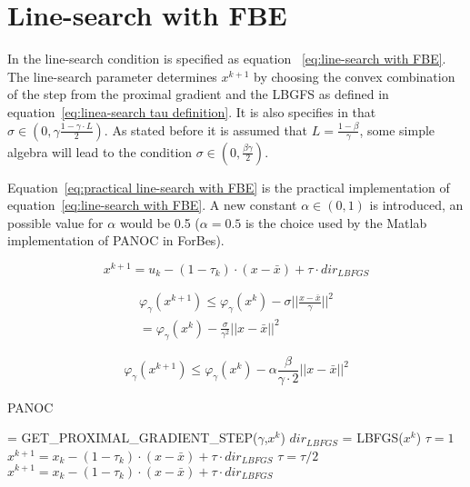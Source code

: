 	
	\section{Line-search with FBE}
	In \cite{LorenzoStella2017} the line-search condition is specified as equation ~\ref{eq:line-search with FBE}. The line-search parameter determines $x^{k+1}$ by choosing the convex combination of the step from the proximal gradient and the LBGFS as defined in equation~\ref{eq:linea-search tau definition}. It is also specifies in \cite{LorenzoStella2017} that $\sigma \in (0, \gamma \frac{1-\gamma\cdot L}{2})$. As stated before it is assumed that $L=\frac{1-\beta}{\gamma}$, some simple algebra will lead to the condition $\sigma \in (0,\frac{\beta \gamma}{2})$.
	
	 Equation~\ref{eq:practical line-search with FBE} is the practical implementation of equation~\ref{eq:line-search with FBE}. A new constant $\alpha \in (0,1)$ is introduced, an possible value for $\alpha$ would be 0.5 ($\alpha=0.5$ is the choice used by the Matlab implementation of PANOC in ForBes).
	
	\begin{equation}
		x^{k+1} = u_k - (1-\tau_k)\cdot (x-\bar{x}) + \tau \cdot dir_{LBFGS}
		\label{eq:linea-search tau definition}
	\end{equation}
	
	\begin{eqnarray}
		\label{eq:line-search with FBE}
		\varphi_{\gamma}(x^{k+1})\leq\varphi_{\gamma}(x^{k}) - \sigma ||\frac{x-\bar{x}}{\gamma}||^2 \\
		=
		\varphi_{\gamma}(x^{k}) - \frac{\sigma}{\gamma^2} ||x-\bar{x}||^2
	\end{eqnarray}
	
	\begin{equation}
		\varphi_{\gamma}(x^{k+1}) \leq 		\varphi_{\gamma}(x^{k}) - \alpha \frac{\beta }{\gamma \cdot 2} ||x-\bar{x}||^2
		\label{eq:practical line-search with FBE}
	\end{equation}
	
	
		
		\begin{algorithm}
			\caption{PANOC}
			\label{alg:PANOC}
			\begin{algorithmic}[1]
				 = GET\_PROXIMAL\_GRADIENT\_STEP($\gamma$,$x^k$)
				\State $ dir_{LBFGS}$ = LBFGS($x^k$)
				\State $\tau =1$
				\State $x^{k+1} = x_k - (1-\tau_k)\cdot (x-\bar{x}) + \tau \cdot dir_{LBFGS}$
				\State $\tau = \tau / 2$
				\State $x^{k+1} = x_k - (1-\tau_k)\cdot (x-\bar{x}) + \tau \cdot dir_{LBFGS}$
				\EndWhile
				\EndProcedure
			\end{algorithmic}
		\end{algorithm}
	